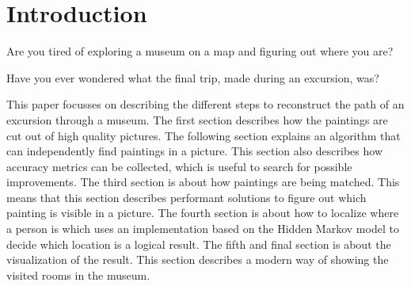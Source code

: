 \section{Introduction}


Are you tired of exploring a museum on a map and figuring out where you are?

Have you ever wondered what the final trip, made during an excursion, was?

This paper focusses on describing the different steps to reconstruct the path of an excursion through a museum. The first section describes how the paintings are cut out of high quality pictures. The following section explains an algorithm that can independently find paintings in a picture. This section also describes how accuracy metrics can be collected, which is useful to search for possible improvements. The third section is about how paintings are being matched. This means that this section describes performant solutions to figure out which painting is visible in a picture. The fourth section is about how to localize where a person is which uses an implementation based on the Hidden Markov model to decide which location is a logical result. The fifth and final section is about the visualization of the result. This section describes a modern way of showing the visited rooms in the museum.
